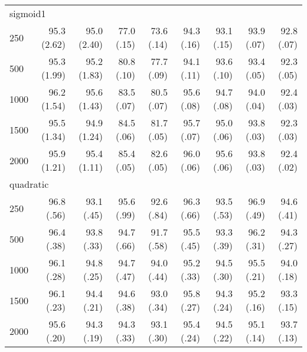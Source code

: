 \documentclass{article}
\begin{document}
\begin{tabular}{lrrrrrrrr}
 \multicolumn{9}{l}{sigmoid1} \\ 
250 & 95.3 (2.62) & 95.0 (2.40) & 77.0 (.15) & 73.6 (.14) & 94.3 (.16) & 93.1 (.15) & 93.9 (.07) & 92.8 (.07) \\ 
  500 & 95.3 (1.99) & 95.2 (1.83) & 80.8 (.10) & 77.7 (.09) & 94.1 (.11) & 93.6 (.10) & 93.4 (.05) & 92.3 (.05) \\ 
  1000 & 96.2 (1.54) & 95.6 (1.43) & 83.5 (.07) & 80.5 (.07) & 95.6 (.08) & 94.7 (.08) & 94.0 (.04) & 92.4 (.03) \\ 
  1500 & 95.5 (1.34) & 94.9 (1.24) & 84.5 (.06) & 81.7 (.05) & 95.7 (.07) & 95.0 (.06) & 93.8 (.03) & 92.3 (.03) \\ 
  2000 & 95.9 (1.21) & 95.4 (1.11) & 85.4 (.05) & 82.6 (.05) & 96.0 (.06) & 95.6 (.06) & 93.8 (.03) & 92.4 (.02) \\ 
          
 \multicolumn{9}{l}{quadratic} \\ 
250 & 96.8 (.56) & 93.1 (.45) & 95.6 (.99) & 92.6 (.84) & 96.3 (.66) & 93.5 (.53) & 96.9 (.49) & 94.6 (.41) \\ 
  500 & 96.4 (.38) & 93.8 (.33) & 94.7 (.66) & 91.7 (.58) & 95.5 (.45) & 93.3 (.39) & 96.2 (.31) & 94.3 (.27) \\ 
  1000 & 96.1 (.28) & 94.8 (.25) & 94.7 (.47) & 94.0 (.44) & 95.2 (.33) & 94.5 (.30) & 95.5 (.21) & 94.0 (.18) \\ 
  1500 & 96.1 (.23) & 94.4 (.21) & 94.6 (.38) & 93.0 (.34) & 95.8 (.27) & 94.3 (.24) & 95.2 (.16) & 93.3 (.15) \\ 
  2000 & 95.6 (.20) & 94.3 (.19) & 94.3 (.33) & 93.1 (.30) & 95.4 (.24) & 94.5 (.22) & 95.1 (.14) & 93.7 (.13) \\ 
   \hline
\end{tabular}
\end{document}
